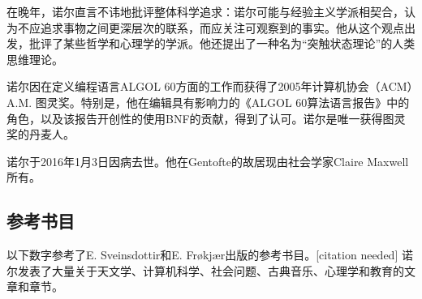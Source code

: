 在晚年，诺尔直言不讳地批评整体科学追求：诺尔可能与经验主义学派相契合，认为不应追求事物之间更深层次的联系，而应关注可观察到的事实。他从这个观点出发，批评了某些哲学和心理学的学派。他还提出了一种名为“突触状态理论”的人类思维理论。

诺尔因在定义编程语言ALGOL 60方面的工作而获得了2005年计算机协会（ACM）A.M. 图灵奖。特别是，他在编辑具有影响力的《ALGOL 60算法语言报告》中的角色，以及该报告开创性的使用BNF的贡献，得到了认可。诺尔是唯一获得图灵奖的丹麦人。

诺尔于2016年1月3日因病去世。他在Gentofte的故居现由社会学家Claire Maxwell所有。
\subsection{参考书目}
以下数字参考了E. Sveinsdottir和E. Frøkjær出版的参考书目。[citation needed] 诺尔发表了大量关于天文学、计算机科学、社会问题、古典音乐、心理学和教育的文章和章节。
